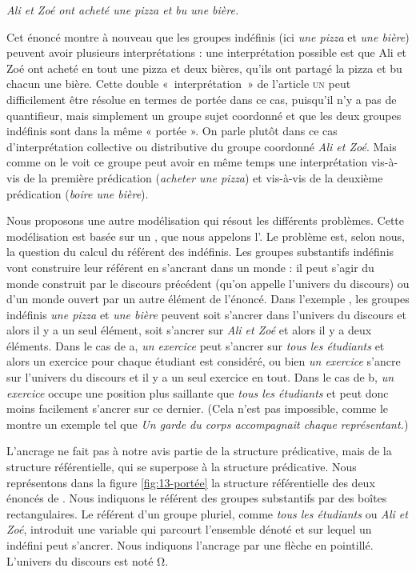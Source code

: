 {\ea\label{ex:13-pizza} \textit{Ali et Zoé ont acheté une pizza et bu une bière.}\z

Cet énoncé montre à nouveau que les groupes indéfinis (ici \textit{une pizza} et \textit{une bière}) peuvent avoir plusieurs interprétations : une interprétation possible est que Ali et Zoé ont acheté en tout une pizza et deux bières, qu’ils ont partagé la pizza et bu chacun une bière. Cette double «~interprétation~» de l’article \textsc{un} peut difficilement être résolue en termes de portée dans ce cas, puisqu’il n’y a pas de quantifieur, mais simplement un groupe sujet coordonné et que les deux groupes indéfinis sont dans la même « portée ». On parle plutôt dans ce cas d’interprétation collective ou distributive du groupe coordonné \textit{Ali et Zoé}. Mais comme on le voit ce groupe peut avoir en même temps une interprétation  vis-à-vis de la première prédication (\textit{acheter une pizza}) et  vis-à-vis de la deuxième prédication (\textit{boire une bière}).

Nous proposons une autre modélisation qui résout les différents problèmes. Cette modélisation est basée sur un , que nous appelons l’. Le problème est, selon nous, la question du calcul du référent des indéfinis. Les groupes substantifs indéfinis vont construire leur référent en s’ancrant dans un monde : il peut s’agir du monde construit par le discours précédent (qu’on appelle l’univers du discours) ou d’un monde ouvert par un autre élément de l’énoncé. Dans l’exemple , les groupes indéfinis \textit{une pizza} et \textit{une bière} peuvent soit s’ancrer dans l’univers du discours et alors il y a un seul élément, soit s’ancrer sur \textit{Ali et Zoé} et alors il y a deux éléments. Dans le cas de a, \textit{un exercice} peut s’ancrer sur \textit{tous les étudiants} et alors un exercice pour chaque étudiant est considéré, ou bien \textit{un exercice} s’ancre sur l’univers du discours et il y a un seul exercice en tout. Dans le cas de b, \textit{un exercice} occupe une position plus saillante que \textit{tous les étudiants} et peut donc moins facilement s’ancrer sur ce dernier. (Cela n’est pas impossible, comme le montre un exemple tel que \textit{Un garde du corps accompagnait chaque représentant.}) 

L’ancrage ne fait pas à notre avis partie de la structure prédicative, mais de la structure référentielle, qui se superpose à la structure prédicative. Nous représentons dans la figure \ref{fig:13-portée} la structure référentielle des deux énoncés de . Nous indiquons le référent des groupes substantifs par des boîtes rectangulaires. Le référent d’un groupe pluriel, comme \textit{tous les étudiants} ou \textit{Ali et Zoé}, introduit une variable qui parcourt l’ensemble dénoté et sur lequel un indéfini peut s’ancrer. Nous indiquons l’ancrage par une flèche en pointillé. L’univers du discours est noté Ω.

}
